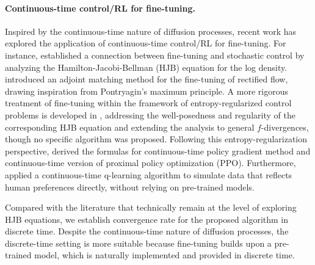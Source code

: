 \documentclass{article}
\begin{document}
\paragraph{Continuous-time control/RL for fine-tuning.}
Inspired by the continuous-time nature of diffusion processes, recent work has explored the application of continuous-time control/RL for fine-tuning. For instance, \citet{berner2022optimal} established a connection between fine-tuning and stochastic control by analyzing the Hamilton-Jacobi-Bellman (HJB) equation for the log density. \citet{domingo2024adjoint} introduced an adjoint matching method for the fine-tuning of rectified flow, drawing inspiration from Pontryagin's maximum principle.
A more rigorous treatment of fine-tuning within the framework of entropy-regularized control problems is developed in \cite{tang2024fine}, addressing the well-posedness and regularity of the corresponding HJB equation and extending the analysis to general $f$-divergences, though no specific algorithm was proposed. Following this entropy-regularization perspective, \citet{zhao2024scores} derived the formulas for  continuous-time policy gradient method and continuous-time version of proximal policy optimization (PPO). Furthermore, \citet{gao2024reward} applied a continuous-time q-learning algorithm to simulate data that reflects human preferences directly, without relying on pre-trained models.

Compared with the literature that technically remain at the level of exploring HJB equations, we establish convergence rate for the proposed algorithm in discrete time. Despite the continuous-time nature of diffusion processes, the discrete-time setting is more suitable because fine-tuning builds upon a pre-trained model, which is naturally implemented and provided in discrete time.
\end{document}
